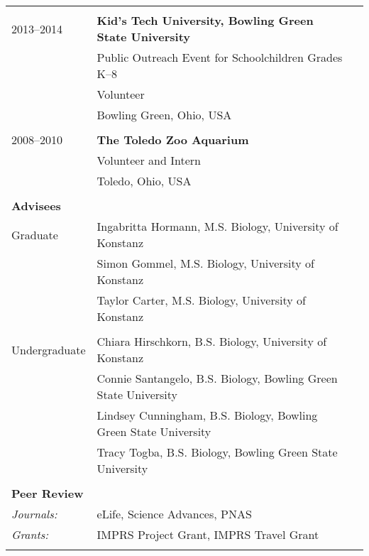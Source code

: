\documentclass[letterpaper,10pt,oneside]{article}
\begin{document}
\begin{longtable}{@{} l p{5.3in}l}
& \\
\large{2013–2014}
& \textbf{Kid's Tech University, Bowling Green State University} \\
& Public Outreach Event for Schoolchildren Grades K–8 \\
& Volunteer \\
& Bowling Green, Ohio, USA \\
& \\
\large{2008–2010}
& \textbf{The Toledo Zoo Aquarium} \\
& Volunteer and Intern \\
& Toledo, Ohio, USA \\
& \\

 \Large{\textbf{Advisees}}  \vspace{5mm} \\
 \large{Graduate} 
 & Ingabritta Hormann, M.S. Biology, University of Konstanz \\
 & Simon Gommel, M.S. Biology, University of Konstanz \\
 & Taylor Carter, M.S. Biology, University of Konstanz \\
 & \\
 \large{Undergraduate}
  & Chiara Hirschkorn, B.S. Biology, University of Konstanz \\
 &  Connie Santangelo, B.S. Biology, Bowling Green State University \\
 & Lindsey Cunningham, B.S. Biology, Bowling Green State University \\
 & Tracy Togba, B.S. Biology, Bowling Green State University \\
& \\

 \Large{\textbf{Peer Review}}  \vspace{5mm} \\
 \normalsize{\textit{Journals: }} & eLife, Science Advances, PNAS \vspace{1mm} \\
 \normalsize{\textit{Grants: }} & IMPRS Project Grant, IMPRS Travel Grant \vspace{1mm} \\
 & \\


\end{longtable}
\end{document}
